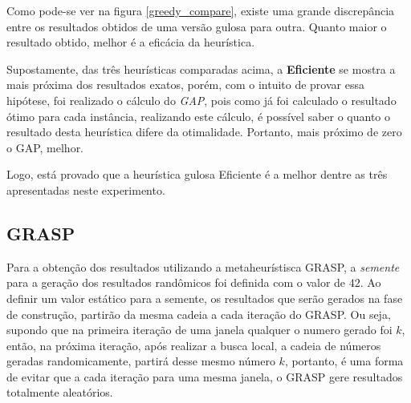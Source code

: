 \documentclass[a4paper, 12pt]{article}
\begin{document}
Como pode-se ver na figura \ref{greedy_compare}, existe uma grande discrepância entre os resultados obtidos 
de uma versão gulosa para outra. Quanto maior o resultado obtido, melhor é a eficácia da heurística. 

Supostamente, das três heurísticas comparadas acima,  a \textbf{Eficiente} se mostra a mais próxima
dos resultados exatos, porém, com o intuito de provar
essa hipótese, foi realizado o cálculo do \textit{GAP}, pois como
já foi calculado o resultado ótimo para cada instância, realizando este cálculo, é possível saber o quanto
o resultado desta heurística difere da otimalidade. Portanto, mais próximo de zero o GAP, melhor.

\begin{table}[htbp]
    \centering
\end{table}

Logo, está provado que a heurística gulosa Eficiente é a melhor dentre as três apresentadas neste experimento.

\clearpage
\subsection{GRASP}
Para a obtenção dos resultados utilizando a metaheurístisca GRASP, a \textit{semente} para a geração
dos resultados randômicos foi definida com o valor de $42$. Ao definir um valor estático para a semente, 
os resultados que serão gerados
na fase de construção, partirão da mesma cadeia a cada iteração do GRASP. Ou seja, supondo que na primeira
iteração de uma janela qualquer o numero gerado foi $k$, então, na próxima iteração, após realizar a busca local,
a cadeia de números geradas randomicamente, partirá desse mesmo número $k$, portanto, é uma forma de evitar
que a cada iteração para uma mesma janela, o GRASP gere resultados totalmente aleatórios.
\end{document}
